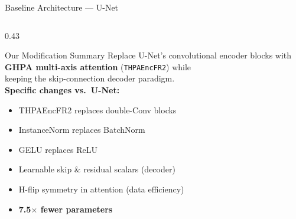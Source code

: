\documentclass[aspectratio=169,10pt]{beamer}
\begin{document}
\begin{frame}{Baseline Architecture --- U-Net \cite{ronneberger2015u}}
\begin{columns}[T]
    \begin{column}{0.43\textwidth}
      \begin{exampleblock}{Our Modification Summary}
        Replace U-Net's convolutional encoder blocks with\\
        \textbf{GHPA multi-axis attention} (\texttt{THPAEncFR2}) while\\
        keeping the skip-connection decoder paradigm.\\[6pt]
        \textbf{Specific changes vs.\ U-Net:}
        \begin{itemize}
          \item THPAEncFR2 replaces double-Conv blocks
          \item InstanceNorm replaces BatchNorm
          \item GELU replaces ReLU
          \item Learnable skip \& residual scalars (decoder)
          \item H-flip symmetry in attention (data efficiency)
          \item \textbf{7.5$\times$ fewer parameters}
        \end{itemize}
      \end{exampleblock}
    \end{column}
  \end{columns}
\end{frame}
\end{document}
